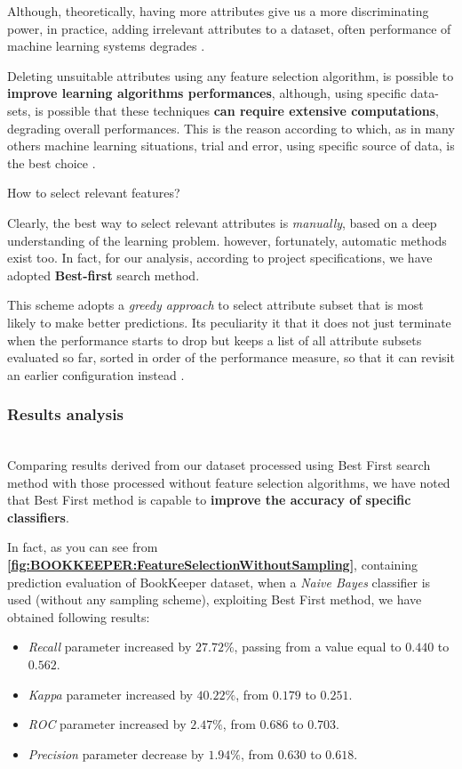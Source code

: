 \documentclass[sigconf]{acmart}
\begin{document}
Although, theoretically, having more attributes give us a more discriminating power, in practice, adding irrelevant attributes to a dataset, often performance of machine learning systems degrades \cite{FalessiDataMining}. 

Deleting unsuitable attributes using any feature selection algorithm, is possible to \textbf{improve learning algorithms performances}, although, using specific data-sets, is possible that these techniques \textbf{can require extensive computations}, degrading overall performances. This is the reason according to which, as in many others machine learning situations, trial and error, using specific source of data, is the best choice \cite{FalessiDataMining}.

How to select relevant features?

Clearly, the best way to select relevant attributes is \textit{manually}, based on a deep understanding of the learning problem. however, fortunately, automatic methods exist too. In fact, for our analysis, according to project specifications, we have adopted \textbf{Best-first} search method. 

This scheme adopts a \textit{greedy approach} to select attribute subset that is most likely to make better predictions. Its peculiarity it that it does not just terminate when the performance starts to drop but keeps a list of all attribute subsets evaluated so far, sorted in order of the performance measure, so that it can revisit an earlier configuration instead \cite{FalessiDataMining}. 

\subsubsection{Results analysis}
\hfill\\
Comparing results derived from our dataset processed using Best First search method with those processed without feature selection algorithms, we have noted that Best First method is capable to \textbf{improve the accuracy of specific classifiers}.
 
In fact, as you can see from \textbf{\cref{fig:BOOKKEEPER:FeatureSelectionWithoutSampling}}, containing prediction evaluation of BookKeeper dataset, when a \textit{Naive Bayes} classifier is used (without any sampling scheme), exploiting Best First method, we have obtained following results:

\begin{itemize}
\item \textit{Recall} parameter increased by $27.72\%$, passing from a value equal to $0.440$ to $0.562$. 
\item \textit{Kappa} parameter increased by $40.22\%$, from $0.179$ to $0.251$. 
\item \textit{ROC} parameter increased by $2.47\%$, from $0.686$ to $0.703$.
\item \textit{Precision} parameter decrease by $1.94\%$, from $0.630$ to $0.618$.
\end{itemize}
 
\end{document}
